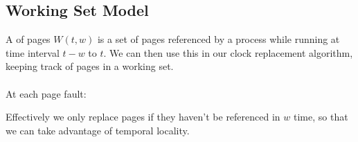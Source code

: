 \documentclass{report}
\begin{document}
        \subsection*{Working Set Model}
            A  of pages $W(t,w)$ is a set of pages referenced by a process while running at time interval $t - w$ to $t$.
            We can then use this in our clock replacement algorithm, keeping track of pages in a working set.
            \\
            \\ At each page fault:
            \begin{enumerate}
            \end{enumerate}
            Effectively we only replace pages if they haven't be referenced in $w$ time, so that we can take advantage of temporal locality.
    
\end{document}
